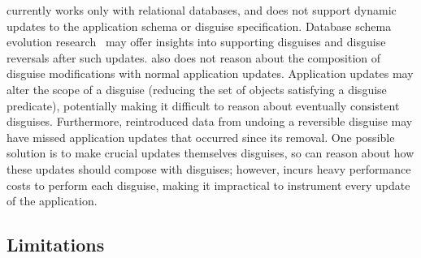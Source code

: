 \sys currently works only with relational databases, and does not support dynamic
updates to the application schema or disguise specification.
%
Database schema evolution research~\cite{schema:evo} may offer insights
into supporting disguises and disguise reversals after such updates.
%
\sys also does not reason about the composition of disguise modifications with normal application
updates.  Application updates may alter the scope of a disguise (\ie reducing the set of objects
satisfying a disguise predicate), potentially making it difficult to reason about eventually
consistent disguises. Furthermore, reintroduced data from undoing a reversible disguise may have
missed application updates that occurred since its removal. One possible solution is to make crucial
updates themselves disguises, so \sys can reason about how these updates should compose with
disguises; however, \sys incurs heavy performance costs to perform each disguise, making it
impractical to instrument every update of the application.


\iffalse
\subsection{Limitations}


